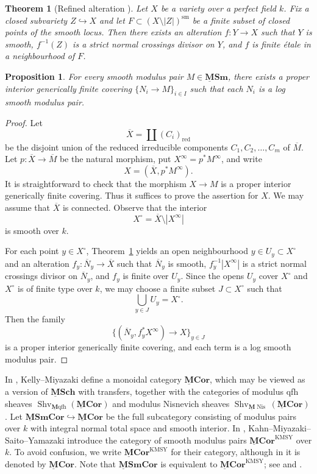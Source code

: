 \documentclass[11pt]{amsart}
\newcommand{\Shv}{{\operatorname{Shv}}}
\newcommand{\Mqfh}{\ulM \text{qfh}}
\newcommand{\red}{{\operatorname{red}}}
\newcommand{\Nis}{{\operatorname{Nis}}}
\newcommand{\ol}{\overline}
\newcommand{\M}{\mathbf{M}}
\newcommand{\ulM}{\underline{\M}}
\newcommand{\ulMCor}{\operatorname{\mathbf{\underline{M}Cor}}}
\newcommand{\ulMSm}{\operatorname{\mathbf{\underline{M}Sm}}}
\newcommand{\ulMSCH}{\operatorname{\mathbf{\underline{M}Sch}}}
\newcommand{\ulMSmCor}{\operatorname{\mathbf{\underline{M}SmCor}}}
\newtheorem{thm}[lemma]{Theorem}
\newtheorem{prop}[lemma]{Proposition}
\theoremstyle{definition}
\theoremstyle{remark}
\numberwithin{equation}{section}
\begin{document}
\begin{thm}[Refined alteration {\cite[Theorem 2.5]{BS17}}]\label{Bhatt-Snowden}
Let $X$ be a variety over a perfect field $k$. Fix a closed subvariety $Z\hookrightarrow X$ and let $F\subset (X\setminus |Z|)^{\mathrm{sm}}$ be a finite subset of closed points of the smooth locus. Then there exists an alteration $f:Y\to X$ such that $Y$ is smooth, $f^{-1}(Z)$ is a strict normal crossings divisor on $Y$, and $f$ is finite \'etale in a neighbourhood of $F$.
\end{thm}

\begin{prop}\label{altalt}
For every smooth modulus pair $M \in \ulMSm$, there exists a proper interior generically finite covering $\{N_i \to M\}_{i\in I}$ such that each $N_i$ is a log smooth modulus pair.
\end{prop}

\begin{proof}
Let
\[
\ol{X}=\coprod (C_i)_{\red}
\]
be the disjoint union of the reduced irreducible components $C_1,C_2,\dots,C_m$ of $\ol{M}$. Let $p:\ol{X} \to \ol{M}$ be the natural morphism, put $X^\infty=p^*M^\infty$, and write
\[
X=(\ol{X},p^*M^\infty).
\]
It is straightforward to check that the morphism $X\to M$ is a proper interior generically finite covering. Thus it suffices to prove the assertion for $X$. We may assume that $\ol{X}$ is connected. Observe that the interior
\[
X^\circ=\ol{X}\setminus |X^\infty|
\]
is smooth over $k$.

For each point $y \in X^\circ$, Theorem~\ref{Bhatt-Snowden} yields an open neighbourhood $y \in U_y \subset  X^\circ$ and an alteration $f_y:\ol{N}_y \to \ol{X}$ such that $\ol{N}_y$ is smooth, $f_y^{-1}|X^\infty|$ is a strict normal crossings divisor on $\ol{N}_y$, and $f_y$ is finite over $U_y$. Since the opens $U_y$ cover $X^\circ$ and $X^\circ$ is of finite type over $k$, we may choose a finite subset $J \subset  X^\circ$ such that
\[
\bigcup_{y \in J} U_y= X^\circ.
\]
Then the family
\[
\{(\ol{N}_y,f_y^*X^\infty) \to X\}_{y \in J}
\]
is a proper interior generically finite covering, and each term is a log smooth modulus pair.
\end{proof}

In \cite[Corollary 5.18]{KM21}, Kelly--Miyazaki define a monoidal category $\ulMCor$, which may be viewed as a version of $\ulMSCH$ with transfers, together with the categories of modulus qfh sheaves $\Shv_{\Mqfh}(\ulMCor)$ and modulus Nisnevich sheaves $\Shv_{\ulM \Nis}(\ulMCor)$. Let $\ulMSmCor \hookrightarrow \ulMCor$ be the full subcategory consisting of modulus pairs over $k$ with integral normal total space and smooth interior. In \cite{KMSY19a}, Kahn--Miyazaki--Saito--Yamazaki introduce the category of smooth modulus pairs $\ulMCor^{\mathrm{KMSY}}$ over $k$. To avoid confusion, we write $\ulMCor^{\mathrm{KMSY}}$ for their category, although in \cite{KMSY19a} it is denoted by $\ulMCor$. Note that $\ulMSmCor$ is equivalent to $\ulMCor^{\mathrm{KMSY}}$; see \cite{KMSY19a} and \cite[Theorem 5.35]{KM21}.
\end{document}
